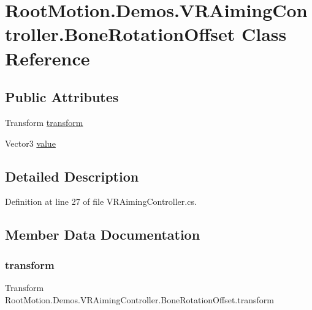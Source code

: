 \hypertarget{class_root_motion_1_1_demos_1_1_v_r_aiming_controller_1_1_bone_rotation_offset}{}\section{Root\+Motion.\+Demos.\+V\+R\+Aiming\+Controller.\+Bone\+Rotation\+Offset Class Reference}
\label{class_root_motion_1_1_demos_1_1_v_r_aiming_controller_1_1_bone_rotation_offset}
\subsection*{Public Attributes}
\begin{DoxyCompactItemize}
\item 
Transform \mbox{\hyperlink{class_root_motion_1_1_demos_1_1_v_r_aiming_controller_1_1_bone_rotation_offset_a671520b717523c724fc6a6c29484d221}{transform}}
\item 
Vector3 \mbox{\hyperlink{class_root_motion_1_1_demos_1_1_v_r_aiming_controller_1_1_bone_rotation_offset_aa0aa1e2e2ab44a35f765ed8f552f4154}{value}}
\end{DoxyCompactItemize}


\subsection{Detailed Description}


Definition at line 27 of file V\+R\+Aiming\+Controller.\+cs.



\subsection{Member Data Documentation}
\mbox{\label{class_root_motion_1_1_demos_1_1_v_r_aiming_controller_1_1_bone_rotation_offset_a671520b717523c724fc6a6c29484d221}} 
\subsubsection{\texorpdfstring{transform}{transform}}
{\footnotesize\ttfamily Transform Root\+Motion.\+Demos.\+V\+R\+Aiming\+Controller.\+Bone\+Rotation\+Offset.\+transform}



